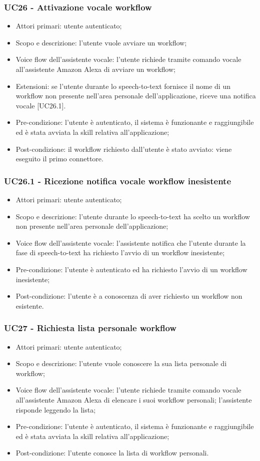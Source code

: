 \subsubsection{UC26 - Attivazione vocale workflow}
\begin{itemize}
	\item Attori primari: utente autenticato;
	\item Scopo e descrizione: l'utente vuole avviare un workflow;
	\item Voice flow dell'assistente vocale: l'utente richiede tramite comando vocale all'assistente Amazon Alexa di avviare un workflow;
	\item Estensioni:
		se l'utente durante lo speech-to-text fornisce il nome di un workflow non presente nell'area personale dell'applicazione, riceve una notifica vocale [UC26.1].
	\item Pre-condizione: l'utente è autenticato, il sistema è funzionante e raggiungibile ed è stata avviata la skill relativa all'applicazione;
	\item Post-condizione: il workflow richiesto dall'utente è stato avviato: viene eseguito il primo connettore.
\end{itemize}
\subsubsection{UC26.1 - Ricezione notifica vocale workflow inesistente}
\begin{itemize}
	\item Attori primari: utente autenticato;
	\item Scopo e descrizione: l'utente durante lo speech-to-text ha scelto un workflow non presente nell'area personale dell'applicazione;
	\item Voice flow dell'assistente vocale: l'assistente notifica che l'utente durante la fase di speech-to-text ha richiesto l'avvio di un workflow inesistente;
	\item Pre-condizione: l'utente è autenticato ed ha richiesto l'avvio di un workflow inesistente;
	\item Post-condizione: l'utente è a conoscenza di aver richiesto un workflow non esistente.
\end{itemize}
\subsubsection{UC27 - Richiesta lista personale workflow}
\begin{itemize}
	\item Attori primari: utente autenticato;
	\item Scopo e descrizione: l'utente vuole conoscere la sua lista personale di workflow;
	\item Voice flow dell'assistente vocale: l'utente richiede tramite comando vocale all'assistente Amazon Alexa di elencare i suoi workflow personali; l'assistente risponde leggendo la lista;
	\item Pre-condizione: l'utente è autenticato, il sistema è funzionante e raggiungibile ed è stata avviata la skill relativa all'applicazione;
	\item Post-condizione: l'utente conosce la lista di workflow personali.
\end{itemize}
